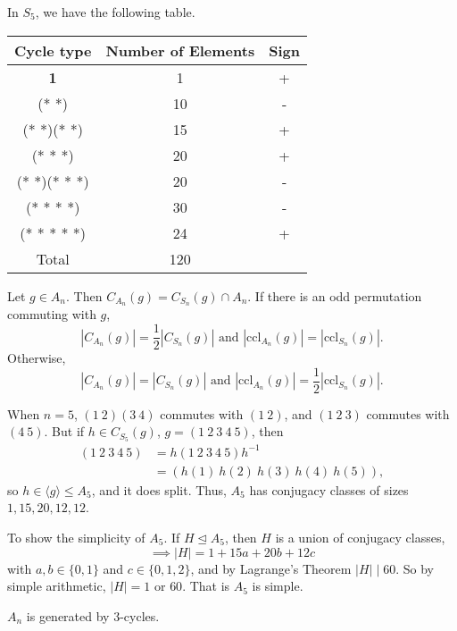 \begin{example}
    In \(S_5\), we have the following table.
    \begin{center}
    \begin{tabular}{c|c|c}
        Cycle type & Number of Elements & Sign\\
        \hline
        \textbf{1}& 1 & +\\
        (* *)& 10& -\\
        (* *)(* *)& 15 & +\\
        (* * *)& 20 & +\\
        (* *)(* * *)& 20& -\\
        (* * * *)&30&-\\
        (* * * * *)&24&+\\
        \hline
        Total&120&
    \end{tabular}
\end{center}
\end{example}
Let \(g \in A_n\). Then \(C_{A_n}(g) = C_{S_n}(g)\cap A_n\). If there is an odd permutation commuting with \(g\),
\[
    \left\vert C_{A_n}(g) \right\vert = \frac{1}{2}\left\vert C_{S_n}(g) \right\vert \text{ and } \left\vert \mathrm{ccl}_{A_n}(g) \right\vert = \left\vert \mathrm{ccl}_{S_n}(g) \right\vert .
\]
Otherwise,
\[
    \left\vert C_{A_n}(g) \right\vert = \left\vert C_{S_n}(g) \right\vert \text{ and } \left\vert \mathrm{ccl}_{A_n}(g) \right\vert = \frac{1}{2}\left\vert \mathrm{ccl}_{S_n}(g) \right\vert .
\]
\begin{example}
    When \(n = 5\), \((1~2)(3~4)\) commutes with \((1~2)\), and \((1~2~3)\) commutes with \((4~5)\). But if \(h \in C_{S_5}(g)\), \(g=(1~2~3~4~5)\), then
    \begin{align*}
        (1~2~3~4~5) &= h (1~2~3~4~5) h^{-1}\\
        &=(h(1)~h(2)~h(3)~h(4)~h(5)),
    \end{align*}
    so \(h \in \langle g\rangle\leq A_5\), and it does split. Thus, \(A_5\) has conjugacy classes of sizes \(1,15,20,12,12\).
    
    To show the simplicity of \(A_5\). If \(H \trianglelefteq A_5\), then \(H\) is a union of conjugacy classes,
    \[
        \implies \left\vert H \right\vert = 1 + 15a + 20b + 12c
    \]
    with \(a,b \in \{0,1\}\) and \(c \in \{0,1,2\}\), and by Lagrange's Theorem \(\left\vert H \right\vert \mid 60\). So by simple arithmetic, \(\left\vert H \right\vert = 1\) or \(60\). That is \(A_5\) is simple.
\end{example}
\begin{lemma}
    \(A_n\) is generated by 3-cycles.
    \label{3gen}
\end{lemma}

